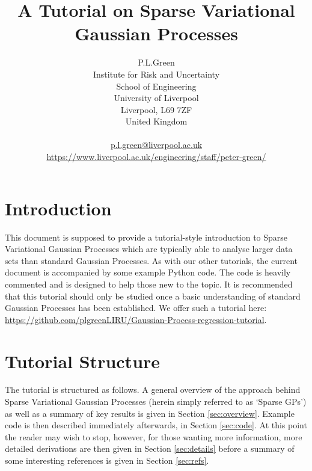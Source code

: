 \documentclass[a4paper, 11pt]{article}
\begin{document}
\title{A Tutorial on Sparse Variational Gaussian Processes}
\author{P.L.Green\\
Institute for Risk and Uncertainty\\
School of Engineering\\
University of Liverpool\\
Liverpool, L69 7ZF\\
United Kingdom\\
\\
\href{mailto:p.l.green@liverpool.ac.uk}{p.l.green@liverpool.ac.uk} \\
\url{https://www.liverpool.ac.uk/engineering/staff/peter-green/}
}
\maketitle

\section{Introduction}
This document is supposed to provide a tutorial-style introduction to Sparse Variational Gaussian Processes which are typically able to analyse larger data sets than standard Gaussian Processes. As with our other tutorials, the current document is accompanied by some example Python code. The code is heavily commented and is designed to help those new to the topic. It is recommended that this tutorial should only be studied once a basic understanding of standard Gaussian Processes has been established. We offer such a tutorial here: \url{https://github.com/plgreenLIRU/Gaussian-Process-regression-tutorial}. \\

\section{Tutorial Structure}
The tutorial is structured as follows. A general overview of the approach behind Sparse Variational Gaussian Processes (herein simply referred to as `Sparse GPs') as well as a summary of key results is given in Section \ref{sec:overview}. Example code is then described immediately afterwards, in Section \ref{sec:code}. At this point the reader may wish to stop, however, for those wanting more information, more detailed derivations are then given in Section \ref{sec:details} before a summary of some interesting references is given in Section \ref{sec:refs}.\\
\end{document}
